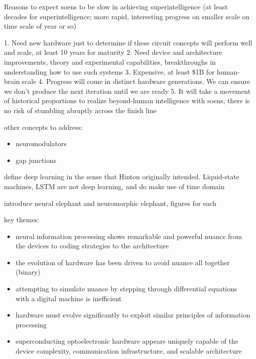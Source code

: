 Reasons to expect soens to be slow in achieving superintelligence (at least decades for superintelligence; more rapid, interesting progress on smaller scale on time scale of year or so)

1. Need new hardware just to determine if these circuit concepts will perform well and scale, at least 10 years for maturity
2. Need device and architecture improvements, theory and experimental capabilities, breakthroughs in understanding how to use such systems
3. Expensive, at least \$1B for human-brain scale
4. Progress will come in distinct hardware generations. We can ensure we don't produce the next iteration until we are ready
5. It will take a movement of historical proportions to realize beyond-human intelligence with soens, there is no risk of stumbling abruptly across the finish line

\vspace{3em}
other concepts to address:
\begin{itemize}
\item neuromodulators
\item gap junctions
\end{itemize}

\vspace{3em}
define deep learning in the sense that Hinton originally intended. Liquid-state machines, LSTM are not deep learning, and do make use of time domain
\cite{lebe2015,gobe2016}

\vspace{3em}
introduce neural elephant and neuromorphic elephant, figures for each

\vspace{3em}
key themes:
\begin{itemize}
\item neural information processing shows remarkable and powerful nuance from the devices to coding strategies to the architecture
\item the evolution of hardware has been driven to avoid nuance all together (binary)
\item attempting to simulate nuance by stepping through differential equations with a digital machine is inefficient
\item hardware must evolve significantly to exploit similar principles of information processing
\item superconducting optoelectronic hardware appears uniquely capable of the device complexity, communication infrastructure, and scalable architecture
\end{itemize}

